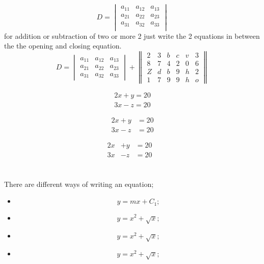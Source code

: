 \documentclass[a4paper, 12pt]{article}
\begin{document}
	
	\begin{equation}
		D=
		\begin{vmatrix}
		a_{11} &  a_{12}& a_{13}\\
		a_{21} & a_{22} & a_{23}\\
		a_{31} & a_{32} & a_{33}\\
		\end{vmatrix}
		\end{equation}
	for addition or subtraction of two or more 2 just write the 2 equations in between the the opening and closing equation.
	\begin{equation*}
		D=
		\begin{vmatrix}
			a_{11} &  a_{12}& a_{13}\\
			a_{21} & a_{22} & a_{23}\\
			a_{31} & a_{32} & a_{33}
		\end{vmatrix}
+
		\begin{Vmatrix}
			2 & 3 & b & c & v & 3\\
			8 & 7 & 4 & 2 & 0 & 6\\
			Z & d & b & 9 & h & 2\\
			1 & 7 & 9 & 9 & h & o
		\end{Vmatrix}
	\end{equation*}
	
	
	
	\begin{gather*}
	2x+y =20\\
	3x -z=20
	\end{gather*}
	
	
		
	\begin{align*}
		2x+y &=20\\
		3x -z&=20
	\end{align*}
	
	\begin{align*}
		2x&+y &=20&\\
		3x& - z &=20&
	\end{align*}
	\pagebreak
	\section*{\huge\centering{}}
	There are different ways of writing an equation;
	
	\begin{itemize}
\item\begin{equation*}
	y=mx + C_1;
	\end{equation*}
\item\begin{equation*}
	y= x^2 + \sqrt{x};
	\end{equation*}
	\item	$$y= x^2 + \sqrt{x};$$
		\item 	\[y= x^2 + \sqrt{x};\]\\
			\end{itemize}
			
\end{document}
